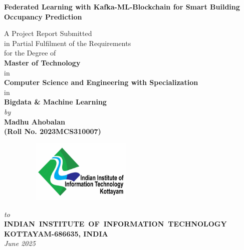 \documentclass[12pt,a4wide]{report}
\theoremstyle{plain}
\theoremstyle{definition}
\theoremstyle{remark}
\begin{document}

\begin{titlepage}
\enlargethispage{2cm}

\begin{center}

\vspace*{-1cm}

\textbf{\Large Federated Learning with Kafka-ML-Blockchain for Smart Building Occupancy Prediction}\\[10pt]

\vspace*{1cm}


                         A Project Report Submitted \\
                     in Partial Fulfilment of the Requirements  \\
                     for the Degree of  \\
                          \vspace{4.5mm}
                   {\Large \bf Master of Technology } \\
                   in \\
                   {\large \bf  Computer Science and Engineering with Specialization} \\
                    in \\
                   {\large \bf  Bigdata \& Machine Learning} \\
                      \vspace{7mm}
                   {\em  by} \\ \vspace{2.5mm}
             {\large \bf Madhu Ahobalan} \\
{\large \bf (Roll No. 2023MCS310007)}\\[.35in]

\vfill

\begin{figure}[h]
  \begin{center}
  \includegraphics[width=6cm, height=3cm]{logo2.jpg}
  \end{center}
\end{figure}
\vspace*{0.2cm}

{\em\large to }\\%
{\bf\large \mbox{INDIAN INSTITUTE OF INFORMATION TECHNOLOGY }}\\%
{\bf\large KOTTAYAM-686635, INDIA}\\%
{\it\large June 2025}
\end{center}

\end{titlepage}
\end{document}
